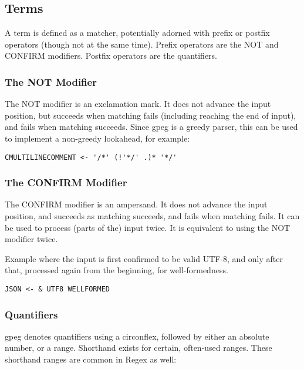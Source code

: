 \subsection{Terms}

A term is defined as a matcher, potentially adorned with prefix
or postfix operators (though not at the same time).
Prefix operators are the NOT and CONFIRM modifiers.
Postfix operators are the quantifiers.

\subsubsection{The NOT Modifier}

The NOT modifier is an exclamation mark.
It does not advance the input position, but succeeds
when matching fails (including reaching the end of input),
and fails when matching succeeds.
Since gpeg is a greedy parser,
this can be used to implement a non-greedy lookahead, for example:
 
\begin{myquote}
\begin{verbatim}
CMULTILINECOMMENT <- '/*' (!'*/' .)* '*/'
\end{verbatim}
\end{myquote}

\subsubsection{The CONFIRM Modifier}

The CONFIRM modifier is an ampersand.
It does not advance the input position, and succeeds
as matching succeeds, and fails when matching fails.
It can be used to process (parts of the) input twice.
It is equivalent to using the NOT modifier twice.

Example where the input is first confirmed to be valid UTF-8,
and only after that, processed again from the beginning, for
well-formedness.
\begin{myquote}
\begin{verbatim}
JSON <- & UTF8 WELLFORMED
\end{verbatim}
\end{myquote}

\subsubsection{Quantifiers}

gpeg denotes quantifiers using a circonflex, followed by either
an absolute number, or a range. Shorthand exists for certain, often-used
ranges. These shorthand ranges are common in Regex as well:

